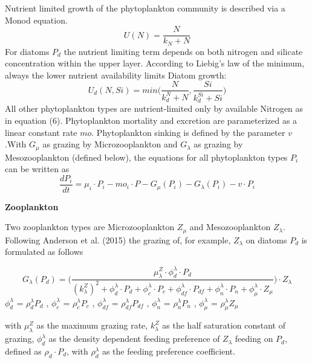 Nutrient limited growth of the phytoplankton community is described via a Monod equation. 
\begin{equation}
U(N) = \frac{N} {k_N + N}
\end{equation}
For diatoms $P_d$ the nutrient limiting term depends on both nitrogen and silicate concentration within the upper layer. According to Liebig's law of the minimum, always the lower nutrient availability limits Diatom growth:
\begin{equation}
U_{d}(N,Si) = min \Big( \frac{N} {k_{d}^N + N}, \frac{Si} {k_{d}^{Si} + Si} \Big)
\end{equation}
All other phytoplankton types are nutrient-limited only by available Nitrogen as in equation (6). Phytoplankton mortality and excretion are parameterized as a linear constant rate $mo$. 
Phytoplankton sinking is defined by the parameter $v$.With $G_{\mu}$ as grazing by Microzooplankton and $G_{\lambda}$ as grazing by Mesozooplankton (defined below), the equations for all phytoplankton types $P_i$ can be written as
\begin{equation}
\frac{dP_{i}}{dt} = \mu_{i} \cdot P_{i} - mo_{i} \cdot P - G_{\mu}(P_{i}) - G_{\lambda}(P_{i}) - v \cdot P_{i}
\end{equation}

{\bf {Zooplankton}}

Two zooplankton types are Microzooplankton $Z_{\mu}$ and Mesozooplankton $Z_{\lambda}$. Following Anderson et al. (2015) the grazing of, for example, $Z_{\lambda}$ on diatoms $P_d$ is formulated as follows

\begin{equation}
G_{\lambda}(P_{d}) = \Bigg( \frac{\mu^Z_{\lambda} \cdot \phi^{\lambda}_d \cdot P_d} 
							{(k^Z_{\lambda})^2 + \phi^{\lambda}_d \cdot P_d + \phi^{\lambda}_c \cdot P_c + \phi^{\lambda}_{df} \cdot P_{df} + \phi^{\lambda}_{n} \cdot P_{n} + \phi^{\lambda}_{\mu} \cdot Z_{\mu}} \Bigg) \cdot Z_{\lambda}
\end{equation}
$\phi^{\lambda}_{d}$ = $\rho^{\lambda}_{d} P_{d}$ , $\phi^{\lambda}_{c}$ = $\rho^{\lambda}_{c} P_{c}$ , $\phi^{\lambda}_{df}$ = $\rho^{\lambda}_{df} P_{df}$ , $\phi^{\lambda}_{n}$ = $\rho^{\lambda}_{n} P_{n}$ , $\phi^{\lambda}_{\mu}$ = $\rho^{\lambda}_{\mu} Z_{\mu}$

with $\mu^Z_{\lambda}$ as the maximum grazing rate, $k^Z_{\lambda}$ as the half saturation constant of grazing, $\phi^{\lambda}_{d}$ as the density dependent feeding preference of $Z_{\lambda}$ feeding on $P_d$, defined as $\rho_{d} \cdot P_{d}$, with $\rho^{\lambda}_{d}$ as the feeding preference coefficient.


